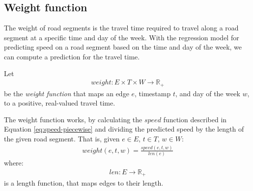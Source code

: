 

\subsection{Weight function}\label{sec:weight-function}
The weight of road segments is the travel time required to travel along a road segment at a specific time and day of the week. With the regression model for predicting speed on a road segment based on the time and day of the week, we can compute a prediction for the travel time.

Let
\begin{align}
weight: E \times T \times W \rightarrow \mathbb{R_+}
\end{align}
be the \emph{weight function} that maps an edge $e$, timestamp $t$, and day of the week $w$, to a positive, real-valued travel time.

The weight function works, by calculating the $speed$ function described in Equation \ref{eq:speed-piecewise} and dividing the predicted speed by the length of the given road segment. That is, given $e \in E$, $t \in T$, $w \in W$:
\begin{align}
weight(e,t,w) = \frac{speed(e,t,w)}{len(e)}
\end{align}
where:
\begin{align}
len:E \rightarrow \mathbb{R_+}
\end{align}
is a length function, that maps edges to their length.

